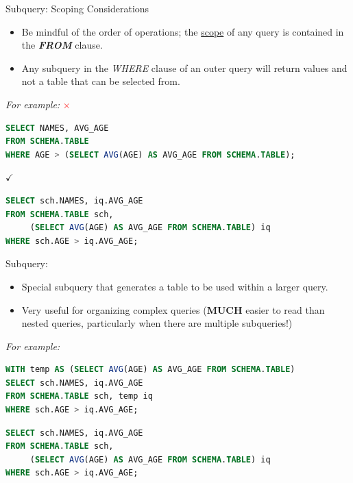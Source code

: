 \documentclass{beamer}
\begin{document}
\begin{frame}[fragile]{Subquery: Scoping Considerations}
\begin{itemize}\small
  \item Be mindful of the order of operations; the \underline{scope} of any query is
        contained in the \textbf{\textit{FROM}} clause.
  \item Any subquery in the \textit{WHERE} clause of an outer query will return values
        and not a table that can be selected from.
\end{itemize}
\textit{For example:}  \textcolor{red}{$\times$}
\begin{lstlisting}[language=SQL]
SELECT NAMES, AVG_AGE
FROM SCHEMA.TABLE
WHERE AGE > (SELECT AVG(AGE) AS AVG_AGE FROM SCHEMA.TABLE);
\end{lstlisting}
 \textcolor{dgreen}{$\checkmark$}
\begin{lstlisting}[language=SQL]
SELECT sch.NAMES, iq.AVG_AGE
FROM SCHEMA.TABLE sch,
     (SELECT AVG(AGE) AS AVG_AGE FROM SCHEMA.TABLE) iq
WHERE sch.AGE > iq.AVG_AGE;
\end{lstlisting}
\end{frame}

\begin{frame}[fragile]{Subquery: }
\begin{itemize}\small
  \item Special subquery that generates a table to be used within a larger query.
  \item Very useful for organizing complex queries (\textbf{MUCH} easier to read than nested
        queries, particularly when there are multiple subqueries!)
\end{itemize}
\textit{For example:}
\begin{lstlisting}[language=SQL]
WITH temp AS (SELECT AVG(AGE) AS AVG_AGE FROM SCHEMA.TABLE)
SELECT sch.NAMES, iq.AVG_AGE
FROM SCHEMA.TABLE sch, temp iq
WHERE sch.AGE > iq.AVG_AGE;
\end{lstlisting}
\begin{lstlisting}[language=SQL]
SELECT sch.NAMES, iq.AVG_AGE
FROM SCHEMA.TABLE sch,
     (SELECT AVG(AGE) AS AVG_AGE FROM SCHEMA.TABLE) iq
WHERE sch.AGE > iq.AVG_AGE;
\end{lstlisting}
\end{frame}
\end{document}
